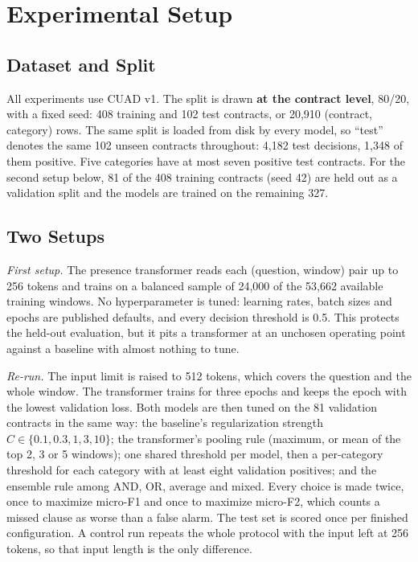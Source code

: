 \documentclass[journal]{IEEEtran}
\begin{document}
\section{Experimental Setup}

\subsection{Dataset and Split}
All experiments use CUAD v1. The split is drawn \textbf{at the contract level}, 80/20, with a fixed
seed: 408 training and 102 test contracts, or 20,910 (contract, category) rows. The same split is
loaded from disk by every model, so ``test'' denotes the same 102 unseen contracts throughout: 4,182
test decisions, 1,348 of them positive. Five categories have at most seven positive test contracts.
For the second setup below, 81 of the 408 training contracts (seed 42) are held out as a validation
split and the models are trained on the remaining 327.

\subsection{Two Setups}
\label{sec:setups}
\emph{First setup.} The presence transformer reads each (question, window) pair up to 256 tokens and
trains on a balanced sample of 24,000 of the 53,662 available training windows. No hyperparameter is
tuned: learning rates, batch sizes and epochs are published defaults, and every decision threshold
is 0.5. This protects the held-out evaluation, but it pits a transformer at an unchosen operating
point against a baseline with almost nothing to tune.

\emph{Re-run.} The input limit is raised to 512 tokens, which covers the question and the whole
window. The transformer trains for three epochs and keeps the epoch with the lowest validation loss.
Both models are then tuned on the 81 validation contracts in the same way: the baseline's
regularization strength $C\in\{0.1,0.3,1,3,10\}$; the transformer's pooling rule (maximum, or mean
of the top 2, 3 or 5 windows); one shared threshold per model, then a per-category threshold for
each category with at least eight validation positives; and the ensemble rule among AND, OR,
average and mixed. Every choice is made twice, once to maximize micro-F1 and once to maximize
micro-F2, which counts a missed clause as worse than a false alarm. The test set is scored once per
finished configuration. A control run repeats the whole protocol with the input left at 256 tokens,
so that input length is the only difference.
\end{document}

